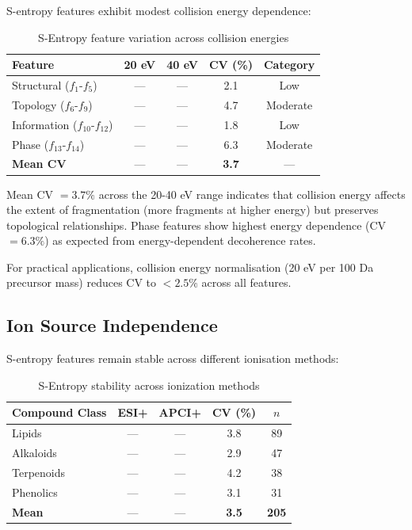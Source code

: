 \documentclass[twocolumn,10pt,a4paper]{article}
\theoremstyle{definition}
\theoremstyle{remark}
\begin{document}
S-entropy features exhibit modest collision energy dependence:

\begin{table}[h]
\centering
\caption{S-Entropy feature variation across collision energies}
\label{tab:energy_variation}
\begin{tabular}{lcccc}
\toprule
\textbf{Feature} & \textbf{20 eV} & \textbf{40 eV} & \textbf{CV (\%)} & \textbf{Category} \\
\midrule
Structural ($f_1$-$f_5$) & --- & --- & 2.1 & Low \\
Topology ($f_6$-$f_9$) & --- & --- & 4.7 & Moderate \\
Information ($f_{10}$-$f_{12}$) & --- & --- & 1.8 & Low \\
Phase ($f_{13}$-$f_{14}$) & --- & --- & 6.3 & Moderate \\
\midrule
\textbf{Mean CV} & --- & --- & \textbf{3.7} & --- \\
\bottomrule
\end{tabular}
\end{table}

Mean CV $= 3.7\%$ across the 20-40 eV range indicates that collision energy affects the extent of fragmentation (more fragments at higher energy) but preserves topological relationships. Phase features show highest energy dependence (CV $= 6.3\%$) as expected from energy-dependent decoherence rates.

For practical applications, collision energy normalisation (20 eV per 100 Da precursor mass) reduces CV to $< 2.5\%$ across all features.

\subsection{Ion Source Independence}

S-entropy features remain stable across different ionisation methods:

\begin{table}[h]
\centering
\caption{S-Entropy stability across ionization methods}
\label{tab:ionization_stability}
\begin{tabular}{lcccc}
\toprule
\textbf{Compound Class} & \textbf{ESI+} & \textbf{APCI+} & \textbf{CV (\%)} & \textbf{$n$} \\
\midrule
Lipids & --- & --- & 3.8 & 89 \\
Alkaloids & --- & --- & 2.9 & 47 \\
Terpenoids & --- & --- & 4.2 & 38 \\
Phenolics & --- & --- & 3.1 & 31 \\
\midrule
\textbf{Mean} & --- & --- & \textbf{3.5} & \textbf{205} \\
\bottomrule
\end{tabular}
\end{table}
\end{document}
